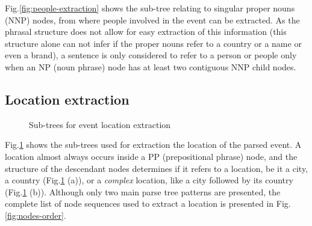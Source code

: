 \documentclass{llncs}
\begin{document}
Fig.\ref{fig:people-extraction} shows the sub-tree relating to singular proper nouns (NNP) nodes, from where people involved in the event can be extracted. As the phrasal structure does not allow for easy extraction of this information (this structure alone can not infer if the proper nouns refer to a country or a name or even a brand), a sentence is only considered to refer to a person or people only when an NP (noun phrase) node has at least two contiguous NNP child nodes.

\subsection{Location extraction}
\label{subsec:approach:location-extraction}

\begin{figure}[h]
	\centering
	\hspace{20mm}
	\caption{Sub-trees for event location extraction}
	\label{fig:location-extraction}
\end{figure}

Fig.\ref{fig:location-extraction} shows the sub-trees used for extraction the location of the parsed event. A location almost always occurs inside a PP (prepositional phrase) node, and the structure of the descendant nodes determines if it refers to a location, be it a city, a country (Fig.\ref{fig:location-extraction} (a)), or a \textit{complex} location, like a city followed by its country (Fig.\ref{fig:location-extraction} (b)). Although only two main parse tree patterns are presented, the complete list of node sequences used to extract a location is presented in Fig.\ref{fig:nodes-order}.
\end{document}
